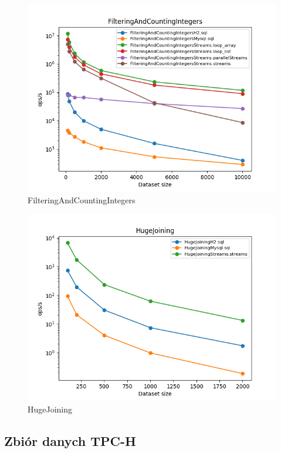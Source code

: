 \documentclass[12pt]{extarticle}
\begin{document}
\begin{figure}[H]
\centering
\includegraphics[width=13cm]{plots/FilteringAndCountingIntegers}
\caption{FilteringAndCountingIntegers}
\end{figure}

\begin{figure}[H]
\centering
\includegraphics[width=13cm]{plots/HugeJoining}
\caption{HugeJoining}
\end{figure}




\subsection{Zbiór danych TPC-H} \label{tpc}
\end{document}
